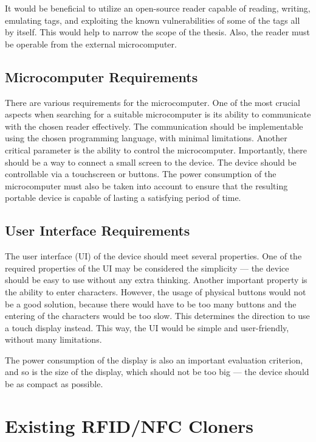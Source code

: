 It would be beneficial to utilize an open-source reader capable of reading, writing, emulating tags, and exploiting the known vulnerabilities of some of the tags all by itself. This would help to narrow the scope of the thesis. Also, the reader must be operable from the external microcomputer.

\subsection{Microcomputer Requirements}

There are various requirements for the microcomputer. One of the most crucial aspects when searching for a suitable microcomputer is its ability to communicate with the chosen reader effectively. The communication should be implementable using the chosen programming language, with minimal limitations. Another critical parameter is the ability to control the microcomputer. Importantly, there should be a way to connect a small screen to the device. The device should be controllable via a touchscreen or buttons. The power consumption of the microcomputer must also be taken into account to ensure that the resulting portable device is capable of lasting a satisfying period of time.


\subsection{User Interface Requirements}

The user interface (UI) of the device should meet several properties. One of the required properties of the UI may be considered the simplicity --- the device should be easy to use without any extra thinking. Another important property is the ability to enter characters. However, the usage of physical buttons would not be a good solution, because there would have to be too many buttons and the entering of the characters would be too slow. This determines the direction to use a touch display instead. This way, the UI would be simple and user-friendly, without many limitations. 

The power consumption of the display is also an important evaluation criterion, and so is the size of the display, which should not be too big --- the device should be as compact as possible.


\section{Existing RFID/NFC Cloners}

